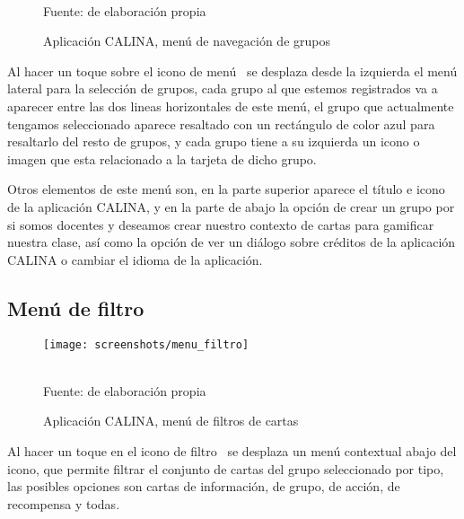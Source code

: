 \begin{figure}[!htb]
\caption[]{Aplicación CALINA, menú de navegación de grupos}
\centering
\begin{adjustbox}{width=5cm}
\end{adjustbox}
\\
{\footnotesize Fuente: de elaboración propia}
\end{figure}

Al hacer un toque sobre el icono de menú \faBars\ se desplaza desde la izquierda el menú lateral para la 
selección de grupos, cada grupo al que estemos registrados va a aparecer entre las dos lineas horizontales de 
este menú, el  grupo que actualmente tengamos seleccionado aparece resaltado con un rectángulo de color azul 
para resaltarlo del resto de grupos, y cada grupo tiene a su izquierda un icono o imagen que esta relacionado 
a la tarjeta de dicho grupo.

Otros elementos de este menú son, en la parte superior aparece el título e icono de la aplicación CALINA, y en 
la parte de abajo la opción de crear un grupo por si somos docentes y deseamos crear nuestro contexto de 
cartas para gamificar nuestra clase, así como la opción de ver un diálogo sobre créditos de la aplicación 
CALINA o cambiar el idioma de la aplicación.

\subsection{Menú de filtro}

\begin{figure}[!htb]
\caption[]{Aplicación CALINA, menú de filtros de cartas}
\centering
\begin{adjustbox}{width=5cm}
	\texttt{[image: screenshots/menu\_filtro]}
\end{adjustbox}
\\
{\footnotesize Fuente: de elaboración propia}
\end{figure}

Al hacer un toque en el icono de filtro \faList\ se desplaza un menú contextual abajo del icono, que permite
filtrar el conjunto de cartas del grupo seleccionado por tipo, las posibles opciones son cartas de 
información, de grupo, de acción, de recompensa y todas.

